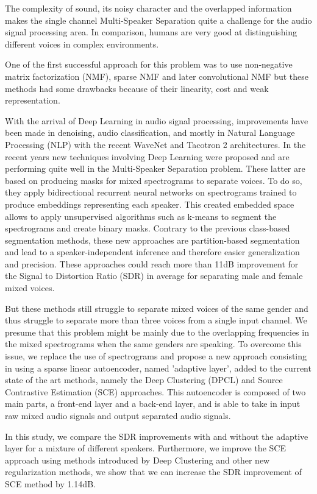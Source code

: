 \documentclass[master, tikz, final,11pt, dvipdfmx]{iscs-thesis}
\date{January 29, 2018}
\begin{document}
\begin{eabstract}

The complexity of sound, its noisy character and the overlapped information makes the single channel Multi-Speaker Separation quite a challenge for the audio signal processing area. In comparison, humans are very good at distinguishing different voices in complex environments.

One of the first successful approach for this problem was to use non-negative matrix factorization (NMF), sparse NMF and later convolutional NMF but these methods had some drawbacks because of their linearity, cost and weak representation.

With the arrival of Deep Learning in audio signal processing, improvements have been made in denoising, audio classification, and mostly in Natural Language Processing  (NLP) with the recent WaveNet and Tacotron 2 architectures. In the recent years new techniques involving Deep Learning were proposed and are performing quite well in the Multi-Speaker Separation problem. These latter are based on producing masks for mixed spectrograms to separate voices. To do so, they apply bidirectional recurrent neural networks on spectrograms trained to produce embeddings representing each speaker. This created embedded space allows to apply unsupervised algorithms such as k-means to segment the spectrograms and create binary masks. Contrary to the previous class-based segmentation methods, these new approaches are partition-based segmentation and lead to a speaker-independent inference and therefore easier generalization and precision. These approaches could reach more than 11dB improvement for the Signal to Distortion Ratio (SDR) in average for separating male and female mixed voices.

But these methods still struggle to separate mixed voices of the same gender and thus struggle to separate more than three voices from a single input channel. We presume that this problem might be mainly due to the overlapping frequencies in the mixed spectrograms when the same genders are speaking. To overcome this issue, we replace the use of spectrograms and propose a new approach consisting in using a sparse linear autoencoder, named 'adaptive layer', added to the current state of the art methods, namely the Deep Clustering (DPCL) and Source Contrastive Estimation (SCE) approaches. This autoencoder is composed of two main parts, a front-end layer and a back-end layer, and is able to take in input raw mixed audio signals and output separated audio signals. 

In this study, we compare the SDR improvements with and without the adaptive layer for a mixture of different speakers. Furthermore, we improve the SCE approach using methods introduced by Deep Clustering and other new regularization methods, we show that we can increase the SDR improvement of SCE method by 1.14dB.

\end{eabstract}
\end{document}
